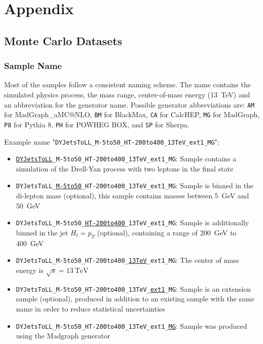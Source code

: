 

\renewcommand\thechapter{A}
\chapter{Appendix}

\section{Monte Carlo Datasets}
\label{app:mc_datasets}

\subsection{Sample Name}
Most of the samples follow a consistent naming scheme. The name contains the simulated physics process, the mass range, center-of-mass energy (\SI{13}{\TeV}) and an abbreviation for the generator name.
Possible generator abbreviations are: \texttt{AM} for MadGraph\_aMC@NLO\cite{Alwall:automatedcomputationtreea}, \texttt{BM} for BlackMax\cite{Dai:BlackMaxblackhole}, \texttt{CA} for CalcHEP\cite{Belyaev:CalcHEP34collider}, \texttt{MG} for MadGraph\cite{Alwall:MadGraph5}, \texttt{P8} for Pythia 8\cite{Sjoestrand:BriefIntroductionPYTHIA}, \texttt{PH} for POWHEG BOX\cite{Frixione:MatchingNLOQCDa,Alioli:generalframeworkimplementing}, and \texttt{SP} for Sherpa\cite{Gleisberg:EventgenerationSHERPA}.

Example name "\texttt{DYJetsToLL\_M-5to50\_HT-200to400\_13TeV\_ext1\_MG}":
\begin{itemize}
\item \texttt{\underline{DYJetsToLL}\_M-5to50\_HT-200to400\_13TeV\_ext1\_MG}: Sample contains a simulation of the Drell-Yan process with two leptons in the final state
\item \texttt{DYJetsToLL\_\underline{M-5to50}\_HT-200to400\_13TeV\_ext1\_MG}: Sample is binned in the di-lepton mass (optional), this sample contains masses between \SI{5}{\GeV} and \SI{50}{\GeV}
\item \texttt{DYJetsToLL\_M-5to50\_\underline{HT-200to400}\_13TeV\_ext1\_MG}: Sample is additionally binned in the jet $H_t = p_T$ (optional), containing a range of \SI{200}{\GeV} to \SI{400}{\GeV}
\item \texttt{DYJetsToLL\_M-5to50\_HT-200to400\_\underline{13TeV}\_ext1\_MG}: The center of mass energy is $\sqrt{s} = \SI{13}{\TeV}$
\item \texttt{DYJetsToLL\_M-5to50\_HT-200to400\_13TeV\_\underline{ext1}\_MG}:
 Sample is an extension sample (optional), produced in addition to an existing sample with the same name in order to reduce statistical uncertainties
\item \texttt{DYJetsToLL\_M-5to50\_HT-200to400\_13TeV\_ext1\_\underline{MG}}:
 Sample was produced using the Madgraph generator
\end{itemize}

